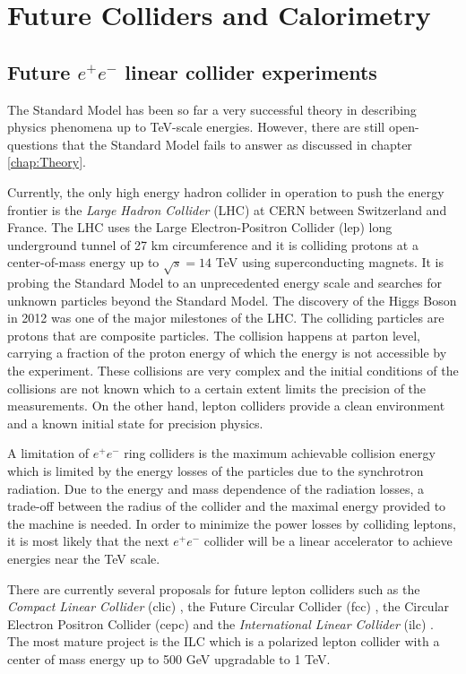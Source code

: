 \part{Future Colliders and Calorimetry}

\chapter{Future $e^+e^-$ linear collider experiments}
\label{chap:FutureColliders}

The Standard Model has been so far a very successful theory in describing physics phenomena up to TeV-scale energies. However, there are still open-questions that the Standard Model fails to answer as discussed in chapter \ref{chap:Theory}.

Currently, the only high energy hadron collider in operation to push the energy frontier is the \textit{Large Hadron Collider} (LHC) at CERN between Switzerland and France. The LHC uses the Large Electron-Positron Collider (\acrshort{lep}) long underground tunnel of 27 km circumference and it is colliding protons at a center-of-mass energy up to $\sqrt{s} = 14$ TeV using superconducting magnets. It is probing the Standard Model to an unprecedented energy scale and searches for unknown particles beyond the Standard Model. The discovery of the Higgs Boson in 2012 \cite{Aad:2012tfa, Chatrchyan:2012xdj} was one of the major milestones of the LHC. The colliding particles are protons that are composite particles. The collision happens at parton level, carrying a fraction of the proton energy of which the energy is not accessible by the experiment. These collisions are very complex and the initial conditions of the collisions are not known which to a certain extent limits the precision of the measurements. On the other hand, lepton colliders provide a clean environment and a known initial state for precision physics.

A limitation of $e^+e^-$ ring colliders is the maximum achievable collision energy which is limited by the energy losses of the particles due to the synchrotron radiation. Due to the energy and mass dependence of the radiation losses, a trade-off between the radius of the collider and the maximal energy provided to the machine is needed. In order to minimize the power losses by colliding leptons, it is most likely that the next $e^+e^-$ collider will be a linear accelerator to achieve energies near the TeV scale.

There are currently several proposals for future lepton colliders such as the \textit{Compact Linear Collider} (\acrshort{clic}) \cite{CLIC_CDR}, the Future Circular Collider (\acrshort{fcc}) \cite{Benedikt:2015kqj}, the Circular Electron Positron Collider (\acrshort{cepc}) \cite{CEPC-SPPCStudyGroup:2015csa, CEPC-SPPCStudyGroup:2015esa} and the \textit{International Linear Collider} (\acrshort{ilc}) \cite{ILC_TDR_Vol1}. The most mature project is the ILC which is a polarized lepton collider with a center of mass energy up to 500 GeV upgradable to 1 TeV.

